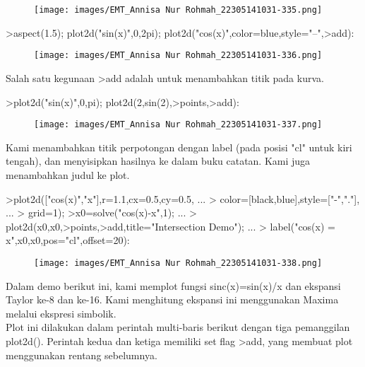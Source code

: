 \documentclass[a4paper,10pt]{article}
\begin{document}
\begin{eulernotebook}
\begin{eulerprompt}
\end{eulerprompt}
\begin{figure}[h]
    \centering
    \texttt{[image: images/EMT\_Annisa Nur Rohmah\_22305141031-335.png]}
\end{figure}
\begin{eulerprompt}
>aspect(1.5); plot2d("sin(x)",0,2pi); plot2d("cos(x)",color=blue,style="--",>add):
\end{eulerprompt}
\begin{figure}[h]
    \centering
    \texttt{[image: images/EMT\_Annisa Nur Rohmah\_22305141031-336.png]}
\end{figure}
\begin{eulercomment}
Salah satu kegunaan \textgreater{}add adalah untuk menambahkan titik pada kurva.
\end{eulercomment}
\begin{eulerprompt}
>plot2d("sin(x)",0,pi); plot2d(2,sin(2),>points,>add):
\end{eulerprompt}
\begin{figure}[h]
    \centering
    \texttt{[image: images/EMT\_Annisa Nur Rohmah\_22305141031-337.png]}
\end{figure}
\begin{eulercomment}
Kami menambahkan titik perpotongan dengan label (pada posisi "cl"
untuk kiri tengah), dan menyisipkan hasilnya ke dalam buku catatan.
Kami juga menambahkan judul ke plot.
\end{eulercomment}
\begin{eulerprompt}
>plot2d(["cos(x)","x"],r=1.1,cx=0.5,cy=0.5, ...
>  color=[black,blue],style=["-","."], ...
>  grid=1);
>x0=solve("cos(x)-x",1);  ...
>  plot2d(x0,x0,>points,>add,title="Intersection Demo");  ...
>  label("cos(x) = x",x0,x0,pos="cl",offset=20):
\end{eulerprompt}
\begin{figure}[h]
    \centering
    \texttt{[image: images/EMT\_Annisa Nur Rohmah\_22305141031-338.png]}
\end{figure}
\begin{eulercomment}
Dalam demo berikut ini, kami memplot fungsi sinc(x)=sin(x)/x dan
ekspansi Taylor ke-8 dan ke-16. Kami menghitung ekspansi ini
menggunakan Maxima melalui ekspresi simbolik.\\
Plot ini dilakukan dalam perintah multi-baris berikut dengan tiga
pemanggilan plot2d(). Perintah kedua dan ketiga memiliki set flag
\textgreater{}add, yang membuat plot menggunakan rentang sebelumnya.


\end{eulercomment}
\end{eulernotebook}
\end{document}
